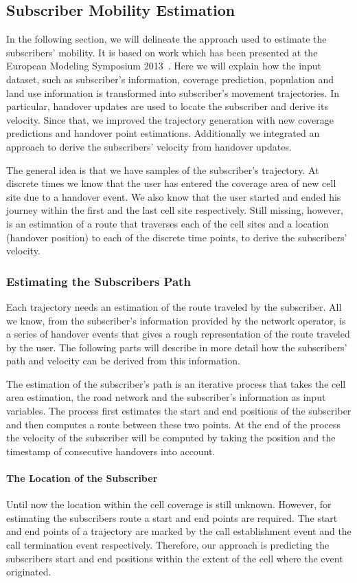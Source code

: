 \subsection{Subscriber Mobility Estimation}
In the following section, we will delineate the approach used to estimate the subscribers' mobility. It is based on work which has been presented at the European Modeling Symposium 2013~\cite{Kieslich2013}. Here we will explain how the input dataset, such as subscriber's information, coverage prediction, population and land use information is transformed into subscriber's movement trajectories. In particular, handover updates are used to locate the subscriber and derive its velocity. Since that, we improved the trajectory generation with new coverage predictions and handover point estimations. Additionally we integrated an approach to derive the subscribers’ velocity from handover updates.

The general idea is that we have samples of the subscriber's trajectory. At discrete times we know that the user has entered the coverage area of new cell site due to a handover event. We also know that the user started and ended his journey within the first and the last cell site respectively. Still missing, however, is an estimation of a route that traverses each of the cell sites and a location (handover position) to each of the discrete time points, to derive the subscribers’ velocity.
\subsubsection{Estimating the Subscribers Path}
Each trajectory needs an estimation of the route traveled by the subscriber. All we know, from the subscriber's information provided by the network operator, is a series of handover events that gives a rough representation of the route traveled by the user. The following parts will describe in more detail how the subscribers’ path and velocity can be derived from this information.

The estimation of the subscriber's path is an iterative process that takes the cell area estimation, the road network and the subscriber's information as input variables. The process first estimates the start and end positions of the subscriber and then computes a route between these two points. At the end of the process the velocity of the subscriber will be computed by taking the position and the timestamp of consecutive handovers into account.


\paragraph{The Location of the Subscriber}
Until now the location within the cell coverage is still unknown. However, for estimating the subscribers route a start and end points are required. The start and end points of a trajectory are marked by the call establishment event and the call termination event respectively. Therefore, our approach is predicting the subscribers start and end positions within the extent of the cell where the event originated.

